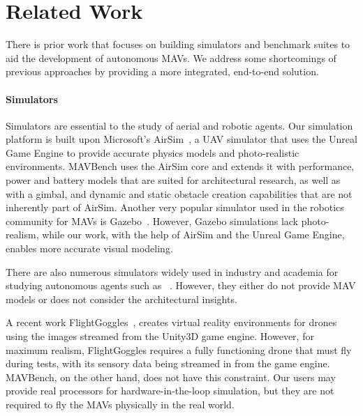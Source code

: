 \section{Related Work}
\label{sec:related}

There is prior work that focuses on building simulators and benchmark suites to aid the development of autonomous MAVs. We address some shortcomings of previous approaches by providing a more integrated, end-to-end solution.

\paragraph{Simulators} Simulators are essential to the study of aerial and robotic agents. Our simulation platform is built upon Microsoft's AirSim~\cite{Airsim_paper}, a UAV simulator that uses the Unreal Game Engine to provide accurate physics models and photo-realistic environments. MAVBench uses the AirSim core and extends it with performance, power and battery models that are suited for architectural research, as well as with a gimbal, and dynamic and static obstacle creation capabilities that are not inherently part of AirSim. Another very popular simulator used in the robotics community for MAVs is Gazebo~\cite{gazebo}. However, Gazebo simulations lack photo-realism, while our work, with the help of AirSim and the Unreal Game Engine, enables more accurate visual modeling.

There are also numerous simulators widely used in industry and academia for studying autonomous agents such as ~\cite{boss-cmu,talos-mit,odin-vtech,uber-simulator, uav_benchmark_simulator}. However, they either do not provide MAV models or does not consider the architectural insights.


A recent work FlightGoggles~\cite{flight-goggles}, creates virtual reality environments for drones using the images streamed from the Unity3D game engine. However, for maximum realism, FlightGoggles requires a fully functioning drone that must fly during tests, with its sensory data being streamed in from the game engine. MAVBench, on the other hand, does not have this constraint. Our users may provide real processors for hardware-in-the-loop simulation, but they are not required to fly the MAVs physically in the real world.

